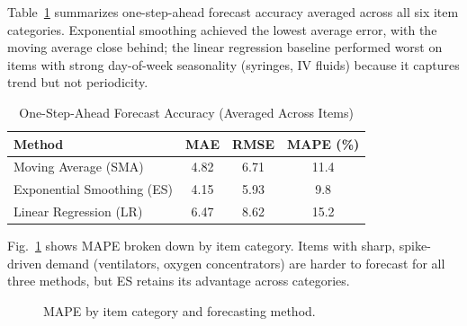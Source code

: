 \documentclass[conference]{IEEEtran}
\begin{document}
Table~\ref{tab:accuracy} summarizes one-step-ahead forecast accuracy averaged across all six item categories. Exponential smoothing achieved the lowest average error, with the moving average close behind; the linear regression baseline performed worst on items with strong day-of-week seasonality (syringes, IV fluids) because it captures trend but not periodicity.

\begin{table}[htbp]
\caption{One-Step-Ahead Forecast Accuracy (Averaged Across Items)}
\begin{center}
\begin{tabular}{@{}lccc@{}}
\toprule
\textbf{Method} & \textbf{MAE} & \textbf{RMSE} & \textbf{MAPE (\%)} \\
\midrule
Moving Average (SMA) & 4.82 & 6.71 & 11.4 \\
Exponential Smoothing (ES) & 4.15 & 5.93 & 9.8 \\
Linear Regression (LR) & 6.47 & 8.62 & 15.2 \\
\bottomrule
\end{tabular}
\label{tab:accuracy}
\end{center}
\end{table}

Fig.~\ref{fig:mape} shows MAPE broken down by item category. Items with sharp, spike-driven demand (ventilators, oxygen concentrators) are harder to forecast for all three methods, but ES retains its advantage across categories.

\begin{figure}[htbp]
\centering
{}
\caption{MAPE by item category and forecasting method.}
\label{fig:mape}
\end{figure}
\end{document}
